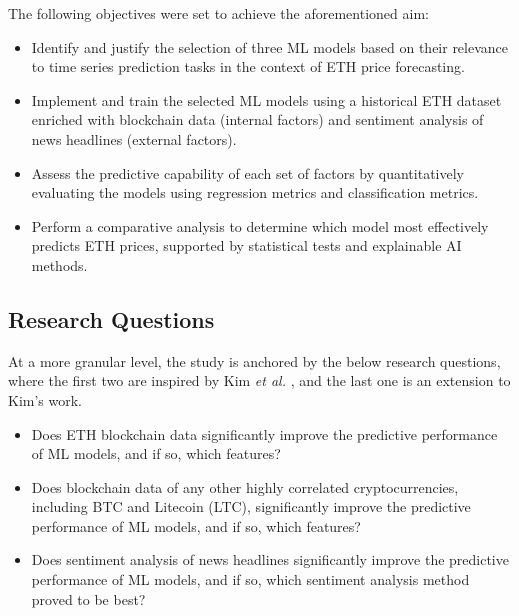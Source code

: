 \documentclass[ %
                    author={Raj Dhakan},
                supervisor={Dr. Ayush Joshi},
                    degree={MSc},
                     title={Ethereum Price Prediction using Internal and External Factors},
                  subtitle={},
                      type={},
                      year={2025}]{dissertation}
\begin{document}
\vspace{0.5cm}
\noindent The following objectives were set to achieve the aforementioned aim:
\begin{itemize}
    \item Identify and justify the selection of three ML models based on their relevance to time series prediction tasks in the context of ETH price forecasting.
    \item Implement and train the selected ML models using a historical ETH dataset enriched with blockchain data (internal factors) and sentiment analysis of news headlines (external factors).
    \item Assess the predictive capability of each set of factors by quantitatively evaluating the models using regression metrics and classification metrics.
    \item Perform a comparative analysis to determine which model most effectively predicts ETH prices, supported by statistical tests and explainable AI methods.
\end{itemize}

\subsection{Research Questions}
At a more granular level, the study is anchored by the below research questions, where the first two are inspired by Kim \textit{et al.} \cite{RN141}, and the last one is an extension to Kim's work. 
\begin{itemize}
    \item Does ETH blockchain data significantly improve the predictive performance of ML models, and if so, which features?
    \item Does blockchain data of any other highly correlated cryptocurrencies, including BTC and Litecoin (LTC), significantly improve the predictive performance of ML models, and if so, which features?
    \item Does sentiment analysis of news headlines significantly improve the predictive performance of ML models, and if so, which sentiment analysis method proved to be best?
\end{itemize}
\end{document}
